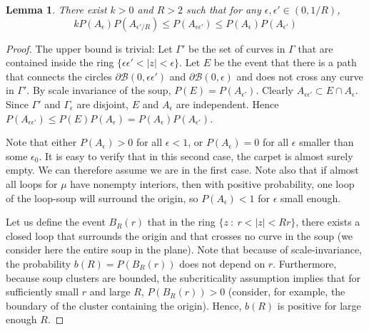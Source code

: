 \documentclass[11pt]{article}
\newtheorem {lemma} [Theorem]    {Lemma}
\newcommand{\eps}{\epsilon}
\newcommand{\geps}{\Gamma_\epsilon}
\newcommand{\PP}{{ P}}
\newcommand{\pa}[1]{\PP (A_{#1})}
\newcommand{\cir}{\partial \B}
\newcommand{\B}{{\mathcal B}}
\begin{document}
\begin{lemma}\label{pa_upper} 
There exist $k > 0$  and $R>2$ such that for any $\eps, \eps' \in (0, 1/R)$,
\begin{equation}
k \pa{\eps} \pa{\eps'/R} \le \pa{\eps \eps'} \le \pa{\eps} \pa{\eps'}
\end{equation}
\end{lemma}

\begin{proof}
The upper bound is trivial: Let $\Gamma'$ be the set of curves in $\Gamma$ 
that are contained
inside the ring $\{ \eps\eps ' < |z| < \eps \}$.
Let $E$ be the event that there is a path that connects the circles
$\cir(0,\eps\eps')$ and $\cir(0,\eps)$ and does not cross any curve in
$\Gamma'$. By scale invariance of the soup, $\PP(E) = \pa{\eps'}$.
Clearly $A_{\eps\eps'} \subset E \cap A_\eps$.
Since $\Gamma'$ and $\geps$ are
disjoint, $E$ and $A_\eps$ are independent.
Hence
$\pa{\eps \eps'} \le \PP(E) \PP(A_\eps) = \pa{\eps} \pa{\eps'}$.

Note that either 
$\pa {\eps} > 0$ for all $\eps<1$, or $\pa {\eps}= 0$ for all $\eps$
smaller than some $\eps_0$.
It is easy to verify that in this second case, the carpet is almost surely empty. 
We can therefore assume we are in the first case.
Note also that if almost all loops for $\mu$ have nonempty interiors,
then with positive probability, one loop of the loop-soup will surround the origin, so
$\pa {\eps} < 1$ for $\eps$ small enough.

Let us define the event $B_R( r)$ that in the ring 
$\{z \ : \ r < |z| < Rr \}$, there exists a closed loop that 
surrounds the origin and that crosses no curve in the soup 
(we consider here the entire soup in the plane). 
Note that because of scale-invariance, the probability $b(R)= P ( B_R(r))$ 
does not depend on $r$. Furthermore, because soup clusters are bounded,
the subcriticality assumption implies that for sufficiently small $r$ and large $R$, 
$P (B_R (r)) >0$ (consider, for example, the boundary of the
cluster containing the origin).
Hence, $b(R)$ is positive for large enough $R$. 


\end{proof}
\end{document}

